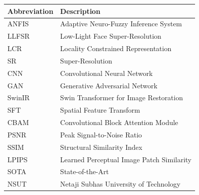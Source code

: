 \begin{table}[h]
    \centering
    \begin{tabular}{ll}
        \textbf{Abbreviation} & \textbf{Description} \\
        \midrule
        ANFIS & Adaptive Neuro-Fuzzy Inference System \\
        LLFSR & Low-Light Face Super-Resolution \\
        LCR & Locality Constrained Representation \\
        SR & Super-Resolution \\
        CNN & Convolutional Neural Network \\
        GAN & Generative Adversarial Network \\
        SwinIR & Swin Transformer for Image Restoration \\
        SFT & Spatial Feature Transform \\
        CBAM & Convolutional Block Attention Module \\
        PSNR & Peak Signal-to-Noise Ratio \\
        SSIM & Structural Similarity Index \\
        LPIPS & Learned Perceptual Image Patch Similarity \\
        SOTA & State-of-the-Art \\
        NSUT & Netaji Subhas University of Technology \\
        \bottomrule
    \end{tabular}
\end{table}

